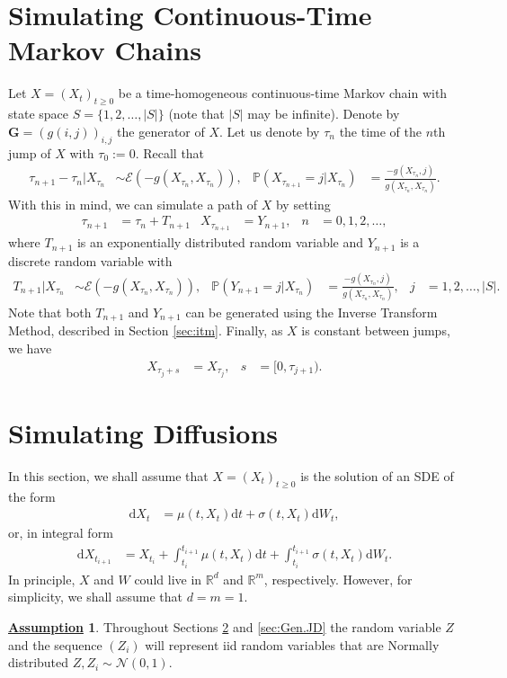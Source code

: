 \documentclass[12pt]{book}
\numberwithin{equation}{chapter}
\theoremstyle{plain}
\numberwithin{theorem}{section}
\theoremstyle{definition}
\newtheorem{assumption}[theorem]{\underline{Assumption}}
\numberwithin{exercise}{chapter}
\newcommand{\<}{\langle}
\renewcommand{\>}{\rangle}
\renewcommand{\(}{\left(}
\renewcommand{\)}{\right)}
\renewcommand{\[}{\left[}
\renewcommand{\]}{\right]}
\newcommand\Pb{\mathds{P}}
\newcommand\Rb{\mathds{R}}
\newcommand\Ec{\mathscr{E}}
\newcommand\Nc{\mathscr{N}}
\newcommand\sig{\sigma}
\newcommand\Gv{\pmb{G}}
\newcommand\dd{\mathrm{d}}
\begin{document}
\section{Simulating Continuous-Time Markov Chains}
Let $X = (X_t)_{t \geq 0}$ be a time-homogeneous continuous-time Markov chain with state space $S = \{ 1, 2, \ldots, |S|\}$ (note that $|S|$ may be infinite).  Denote by $\Gv = (g(i,j))_{i,j}$ the generator of $X$.  Let us denote by $\tau_n$ the time of the $n$th jump of $X$ with $\tau_0 := 0$.  Recall that
\begin{align}
\tau_{n+1} - \tau_n | X_{\tau_n}
	&\sim \Ec( -g(X_{\tau_n},X_{\tau_n}) ) , &
\Pb( X_{\tau_{n+1}} = j | X_{\tau_n} )
	&=	\frac{-g(X_{\tau_n},j)}{g(X_{\tau_n},X_{\tau_n})} .
\end{align}
With this in mind, we can simulate a path of $X$ by setting
\begin{align}
\tau_{n+1}
	&=	\tau_n + T_{n+1} &
X_{\tau_{n+1}}
	&=	Y_{n+1} , &
n
	&=	0, 1, 2, \ldots ,
\end{align}
where $T_{n+1}$ is an exponentially distributed random variable and $Y_{n+1}$ is a discrete random variable with
\begin{align}
T_{n+1} | X_{\tau_n}
	&\sim \Ec(-g(X_{\tau_n},X_{\tau_n})) , &
\Pb( Y_{n+1} = j | X_{\tau_n} )
	&=	\frac{-g(X_{\tau_n},j)}{g(X_{\tau_n},X_{\tau_n})} , &
j
	&=	1, 2, \ldots, |S| .
\end{align}
Note that both $T_{n+1}$ and $Y_{n+1}$ can be generated using the Inverse Transform Method, described in Section \ref{sec:itm}. Finally, as $X$ is constant between jumps, we have
\begin{align}
X_{\tau_j + s}
	&=	X_{\tau_j} , &
s
	&=	[0, \tau_{j+1}) .
\end{align}


\section{Simulating Diffusions}
\label{sec:Gen.Diffs}
In this section, we shall assume that $X = (X_t)_{t \geq 0}$ is the solution of an SDE of the form
\begin{align}
\dd X_t
	&=	\mu(t,X_t) \dd t + \sig(t, X_t) \dd W_t , \label{eq:sde.mc}
\end{align}
or, in integral form
\begin{align}
\dd X_{t_{i+1}}
	&=	X_{t_i} + \int_{t_i}^{t_{i+1}} \mu(t,X_t) \dd t + \int_{t_i}^{t_{i+1}} \sig(t,X_t) \dd W_t .
\end{align}
In principle, $X$ and $W$ could live in $\Rb^d$ and $\Rb^m$, respectively.  However, for simplicity, we shall assume that $d = m = 1$.
\begin{assumption}
Throughout Sections \ref{sec:Gen.Diffs} and \ref{sec:Gen.JD} the random variable $Z$ and the sequence $(Z_i)$ will represent iid random variables that are Normally distributed $Z, Z_i \sim \Nc(0,1)$.
\end{assumption}
\end{document}
